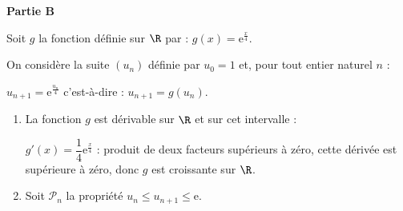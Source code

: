 \bigskip

\textbf{Partie B}

\medskip

Soit $g$ la fonction définie sur $\R$ par : 
$g(x) = \text{e}^{\frac{x}{4}}.$

On considère la suite $\left(u_n\right)$ définie par $u_0 = 1$ et, pour tout entier naturel $n$ :

$u_{n+1} = \text{e}^{\frac{u_n}{4}}$ c'est-à-dire : $u_{n+1} = g\left(u_n\right)$.

\medskip

\begin{enumerate}
\item %
La fonction $g$ est dérivable sur $\R$ et sur cet intervalle :

$g'(x) = \dfrac14 \text{e}^{\frac{x}{4}}$ : produit de deux facteurs supérieurs à zéro, cette dérivée est supérieure à zéro, donc $g$ est croissante sur $\R$.
\item %
Soit $\mathcal{P}_n$ la propriété $u_n \leqslant  u_{n+1} \leqslant \text{e}$.

\end{enumerate}
